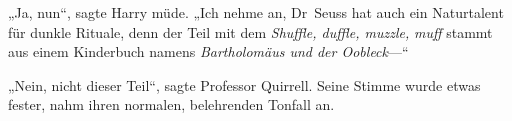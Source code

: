 „Ja, nun“, sagte Harry müde.
„Ich nehme an, Dr~Seuss hat auch ein Naturtalent für dunkle Rituale, denn der Teil mit dem \emph{Shuffle, duffle, muzzle,} \emph{muff} stammt aus einem Kinderbuch namens \emph{Bartholomäus und der Oobleck}—“

„Nein, nicht dieser Teil“, sagte Professor Quirrell. Seine Stimme wurde etwas fester, nahm ihren normalen, belehrenden Tonfall an.
